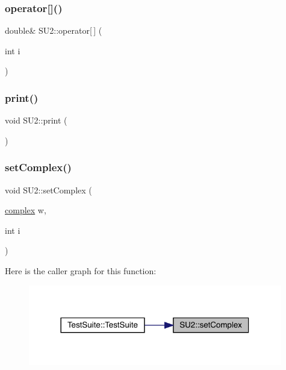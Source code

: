 \subsubsection{\texorpdfstring{operator[]()}{operator[]()}}
{\footnotesize\ttfamily double\& S\+U2\+::operator\mbox{[}$\,$\mbox{]} (\begin{DoxyParamCaption}\item[{int}]{i }\end{DoxyParamCaption})\hspace{0.3cm}{\ttfamily [inline]}}

\mbox{\label{class_s_u2_a1210d531ef84574deb5f03dd24de80cf}} 
\subsubsection{\texorpdfstring{print()}{print()}}
{\footnotesize\ttfamily void S\+U2\+::print (\begin{DoxyParamCaption}{ }\end{DoxyParamCaption})}

\mbox{\label{class_s_u2_afe1d093aaf7325c1a7490f84e4c59b12}} 
\subsubsection{\texorpdfstring{setComplex()}{setComplex()}}
{\footnotesize\ttfamily void S\+U2\+::set\+Complex (\begin{DoxyParamCaption}\item[{\mbox{\hyperlink{classcomplex}{complex}}}]{w,  }\item[{int}]{i }\end{DoxyParamCaption})}

Here is the caller graph for this function\+:\nopagebreak
\begin{figure}[H]
\begin{center}
\leavevmode
\includegraphics[width=314pt]{class_s_u2_afe1d093aaf7325c1a7490f84e4c59b12_icgraph}
\end{center}
\end{figure}
\mbox{\label{class_s_u2_a798389d4b2bc24cea6a466473004e3f8}} 
